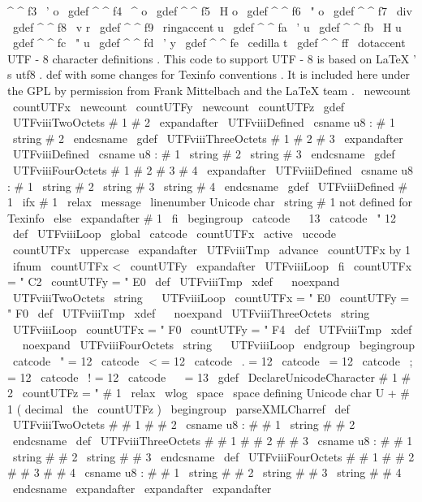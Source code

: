 {{{{{^
^
f3
{
\
'
o
}
\
gdef
^
^
f4
{
\
^
o
}
\
gdef
^
^
f5
{
\
H
o
}
\
gdef
^
^
f6
{
\
"
o
}
\
gdef
^
^
f7
{
\
div
}
\
gdef
^
^
f8
{
\
v
r
}
\
gdef
^
^
f9
{
\
ringaccent
u
}
\
gdef
^
^
fa
{
\
'
u
}
\
gdef
^
^
fb
{
\
H
u
}
\
gdef
^
^
fc
{
\
"
u
}
\
gdef
^
^
fd
{
\
'
y
}
\
gdef
^
^
fe
{
\
cedilla
t
}
\
gdef
^
^
ff
{
\
dotaccent
{
}
}
}
%
UTF
-
8
character
definitions
.
%
%
This
code
to
support
UTF
-
8
is
based
on
LaTeX
'
s
utf8
.
def
with
some
%
changes
for
Texinfo
conventions
.
It
is
included
here
under
the
GPL
by
%
permission
from
Frank
Mittelbach
and
the
LaTeX
team
.
%
\
newcount
\
countUTFx
\
newcount
\
countUTFy
\
newcount
\
countUTFz
\
gdef
\
UTFviiiTwoOctets
#
1
#
2
{
\
expandafter
\
UTFviiiDefined
\
csname
u8
:
#
1
\
string
#
2
\
endcsname
}
%
\
gdef
\
UTFviiiThreeOctets
#
1
#
2
#
3
{
\
expandafter
\
UTFviiiDefined
\
csname
u8
:
#
1
\
string
#
2
\
string
#
3
\
endcsname
}
%
\
gdef
\
UTFviiiFourOctets
#
1
#
2
#
3
#
4
{
\
expandafter
\
UTFviiiDefined
\
csname
u8
:
#
1
\
string
#
2
\
string
#
3
\
string
#
4
\
endcsname
}
\
gdef
\
UTFviiiDefined
#
1
{
%
\
ifx
#
1
\
relax
\
message
{
\
linenumber
Unicode
char
\
string
#
1
not
defined
for
Texinfo
}
%
\
else
\
expandafter
#
1
%
\
fi
}
\
begingroup
\
catcode
\
~
13
\
catcode
\
"
12
\
def
\
UTFviiiLoop
{
%
\
global
\
catcode
\
countUTFx
\
active
\
uccode
\
~
\
countUTFx
\
uppercase
\
expandafter
{
\
UTFviiiTmp
}
%
\
advance
\
countUTFx
by
1
\
ifnum
\
countUTFx
<
\
countUTFy
\
expandafter
\
UTFviiiLoop
\
fi
}
\
countUTFx
=
"
C2
\
countUTFy
=
"
E0
\
def
\
UTFviiiTmp
{
%
\
xdef
~
{
\
noexpand
\
UTFviiiTwoOctets
\
string
~
}
}
\
UTFviiiLoop
\
countUTFx
=
"
E0
\
countUTFy
=
"
F0
\
def
\
UTFviiiTmp
{
%
\
xdef
~
{
\
noexpand
\
UTFviiiThreeOctets
\
string
~
}
}
\
UTFviiiLoop
\
countUTFx
=
"
F0
\
countUTFy
=
"
F4
\
def
\
UTFviiiTmp
{
%
\
xdef
~
{
\
noexpand
\
UTFviiiFourOctets
\
string
~
}
}
\
UTFviiiLoop
\
endgroup
\
begingroup
\
catcode
\
"
=
12
\
catcode
\
<
=
12
\
catcode
\
.
=
12
\
catcode
\
=
12
\
catcode
\
;
=
12
\
catcode
\
!
=
12
\
catcode
\
~
=
13
\
gdef
\
DeclareUnicodeCharacter
#
1
#
2
{
%
\
countUTFz
=
"
#
1
\
relax
%
\
wlog
{
\
space
\
space
defining
Unicode
char
U
+
#
1
(
decimal
\
the
\
countUTFz
)
}
%
\
begingroup
\
parseXMLCharref
\
def
\
UTFviiiTwoOctets
#
#
1
#
#
2
{
%
\
csname
u8
:
#
#
1
\
string
#
#
2
\
endcsname
}
%
\
def
\
UTFviiiThreeOctets
#
#
1
#
#
2
#
#
3
{
%
\
csname
u8
:
#
#
1
\
string
#
#
2
\
string
#
#
3
\
endcsname
}
%
\
def
\
UTFviiiFourOctets
#
#
1
#
#
2
#
#
3
#
#
4
{
%
\
csname
u8
:
#
#
1
\
string
#
#
2
\
string
#
#
3
\
string
#
#
4
\
endcsname
}
%
\
expandafter
\
expandafter
\
expandafter
}}}}}
